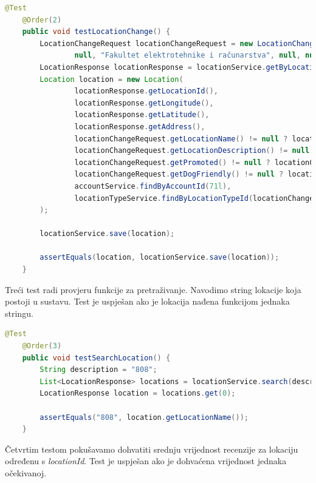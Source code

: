     \begin{lstlisting}[language=Java, breaklines=true]
    @Test
    @Order(2)
    public void testLocationChange() {
        LocationChangeRequest locationChangeRequest = new LocationChangeRequest(2l, null,
                null, "Fakultet elektrotehnike i računarstva", null, null);
        LocationResponse locationResponse = locationService.getByLocationId(locationChangeRequest.getLocationId());
        Location location = new Location(
                locationResponse.getLocationId(),
                locationResponse.getLongitude(),
                locationResponse.getLatitude(),
                locationResponse.getAddress(),
                locationChangeRequest.getLocationName() != null ? locationChangeRequest.getLocationName() : locationResponse.getLocationName(),
                locationChangeRequest.getLocationDescription() != null ? locationChangeRequest.getLocationDescription() : locationResponse.getLocationDescription(),
                locationChangeRequest.getPromoted() != null ? locationChangeRequest.getPromoted() : locationResponse.getPromoted(),
                locationChangeRequest.getDogFriendly() != null ? locationChangeRequest.getDogFriendly() : locationResponse.getDogFriendly(),
                accountService.findByAccountId(71l),
                locationTypeService.findByLocationTypeId(locationChangeRequest.getLocationTypeId() != null ? locationChangeRequest.getLocationTypeId() : locationResponse.getLocationTypeId()).orElse(null)
        );

        locationService.save(location);

        assertEquals(location, locationService.save(location));
    }
    \end{lstlisting}

    \eject
    Treći test radi provjeru funkcije za pretraživanje. Navodimo string lokacije koja postoji u sustavu. Test je uspješan ako je lokacija nađena funkcijom jednaka stringu.

    \begin{lstlisting}[language=Java, breaklines=true]
    @Test
    @Order(3)
    public void testSearchLocation() {
        String description = "808";
        List<LocationResponse> locations = locationService.search(description);
        LocationResponse location = locations.get(0);

        assertEquals("808", location.getLocationName());
    }
    \end{lstlisting}

    Četvrtim testom pokušavamo dohvatiti srednju vrijednost recenzije za lokaciju određenu s \textit{locationId}. Test je uspješan ako je dohvaćena vrijednost jednaka očekivanoj.

